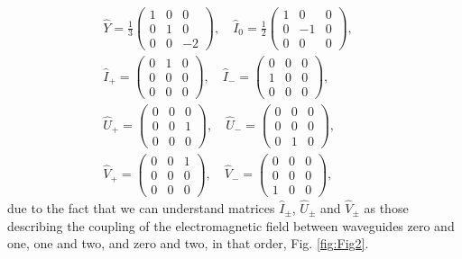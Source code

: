 \documentclass[9pt,twocolumn,twoside]{osajnl}
\begin{document}
\begin{eqnarray}
\hat{Y} = \frac{1}{3} \left( \begin{array}{ccc} 
1&0&0\\0&1&0\\0&0&-2    \end{array}\right), \quad
\hat{I}_{0} = \frac{1}{2} \left( \begin{array}{ccc} 1&0&0\\0&-1&0\\0&0&0 \end{array}\right), \quad  
\nonumber\\
\hat{I}_{+} = \left( \begin{array}{ccc} 0&1&0\\0&0&0\\0&0&0 \end{array}\right), \quad 
\hat{I}_{-} = \left( \begin{array}{ccc} 0&0&0\\1&0&0\\0&0&0 \end{array}\right), \quad \nonumber\\
\hat{U}_{+} = \left( \begin{array}{ccc} 0&0&0\\0&0&1\\0&0&0 \end{array}\right), \quad 
\hat{U}_{-} = \left( \begin{array}{ccc} 0&0&0\\0&0&0\\0&1&0 \end{array}\right), \quad \nonumber \\
\hat{V}_{+} = \left( \begin{array}{ccc} 0&0&1\\0&0&0\\0&0&0 \end{array}\right), \quad 
\hat{V}_{-} = \left( \begin{array}{ccc} 0&0&0\\0&0&0\\1&0&0 \end{array}\right), \label{eq:gens}
\end{eqnarray}
due to the fact that we can understand matrices $\hat{I}_{\pm}$, $\hat{U}_{\pm}$ and $\hat{V}_{\pm}$ as those describing the coupling of the electromagnetic field between waveguides zero and one, one and two, and zero and two, in that order, Fig. \ref{fig:Fig2}.
\end{document}
